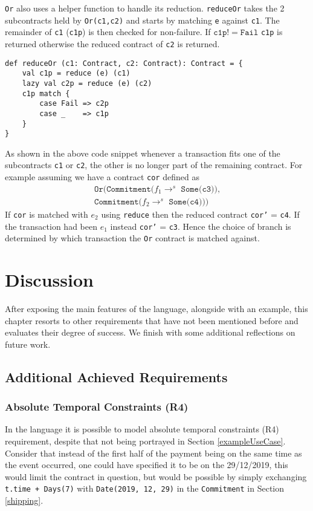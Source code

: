 \documentclass{ituthesis}
\begin{document}
\texttt{Or} also uses a helper function to handle its reduction. \texttt{reduceOr} takes the 2 subcontracts held by \texttt{Or(c1,c2)} and starts by matching \texttt{e} against \texttt{c1}. The remainder of \texttt{c1} (\texttt{c1p}) is then checked for non-failure. If $\texttt{c1p} != \texttt{Fail}$ \texttt{c1p} is returned otherwise the reduced contract of \texttt{c2} is returned.
\begin{lstlisting}
def reduceOr (c1: Contract, c2: Contract): Contract = {
    val c1p = reduce (e) (c1)
    lazy val c2p = reduce (e) (c2)
    c1p match {
        case Fail => c2p
        case _    => c1p
    }
}
\end{lstlisting}
As shown in the above code snippet whenever a transaction fits one of the subcontracts \texttt{c1} or \texttt{c2}, the other is no longer part of the remaining contract. For example assuming we have a contract \texttt{cor} defined as
\begin{align*}
    \texttt{Or(Commitment($f_1 \rightarrow^s$ Some(c3)),} \\
    \texttt{Commitment($f_2 \rightarrow^s$ Some(c4)))}
\end{align*}
If \texttt{cor} is matched with $e_2$ using \texttt{reduce} then the reduced contract \texttt{cor'} = \texttt{c4}. If the transaction had been $e_1$ instead \texttt{cor'} = \texttt{c3}. Hence the choice of branch is determined by which transaction the \texttt{Or} contract is matched against.

\chapter{Discussion}

After exposing the main features of the language, alongside with an example, this chapter resorts to other requirements that have not been mentioned before and evaluates their degree of success. We finish with some additional reflections on future work.

\section{Additional Achieved Requirements} \label{canDo}

\subsection{Absolute Temporal Constraints (R4)}
In the language it is possible to model absolute temporal constraints (R4) requirement, despite that not being portrayed in Section \ref{exampleUseCase}. Consider that instead of the first half of the payment being on the same time as the event occurred, one could have specified it to be on the 29/12/2019, this would limit the contract in question, but would be possible by simply exchanging \texttt{t.time + Days(7)} with \texttt{Date(2019, 12, 29)} in the \texttt{Commitment} in Section \ref{shipping}.
\end{document}
